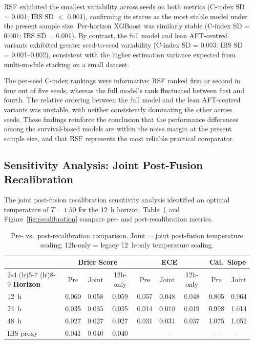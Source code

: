 \documentclass[fire,article,submit,pdftex]{../Definitions/mdpi}
\begin{document}
RSF exhibited the smallest variability across seeds on both metrics (C-index SD = 0.001; IBS SD $<$ 0.001), confirming its status as the most stable model under the present sample size.
Per-horizon XGBoost was similarly stable (C-index SD = 0.001; IBS SD = 0.001).
By contrast, the full model and lean AFT-centred variants exhibited greater seed-to-seed variability (C-index SD = 0.003; IBS SD = 0.001--0.002), consistent with the higher estimation variance expected from multi-module stacking on a small dataset.

The per-seed C-index rankings were informative: RSF ranked first or second in four out of five seeds, whereas the full model's rank fluctuated between first and fourth.
The relative ordering between the full model and the lean AFT-centred variants was unstable, with neither consistently dominating the other across seeds.
These findings reinforce the conclusion that the performance differences among the survival-based models are within the noise margin at the present sample size, and that RSF represents the most reliable practical comparator.

\subsection{Sensitivity Analysis: Joint Post-Fusion Recalibration}\label{sec:recal_results}

The joint post-fusion recalibration sensitivity analysis identified an optimal temperature of $T = 1.50$ for the 12~h horizon.
Table~\ref{tab:recalibration} and Figure~\ref{fig:recalibration} compare pre- and post-recalibration metrics.

\begin{table}[!ht]
\caption{Pre- vs.\ post-recalibration comparison. Joint = joint post-fusion temperature scaling; 12h-only = legacy 12~h-only temperature scaling.}\label{tab:recalibration}
\begin{tabular}{lcccccccc}
\toprule
 & \multicolumn{3}{c}{\textbf{Brier Score}} & \multicolumn{3}{c}{\textbf{ECE}} & \multicolumn{2}{c}{\textbf{Cal.\ Slope}} \\
\cmidrule(lr){2-4} \cmidrule(lr){5-7} \cmidrule(lr){8-9}
\textbf{Horizon} & Pre & Joint & 12h-only & Pre & Joint & 12h-only & Pre & Joint \\
\midrule
12~h & 0.060 & 0.058 & 0.059 & 0.057 & 0.048 & 0.048 & 0.805 & 0.964 \\
24~h & 0.035 & 0.035 & 0.035 & 0.014 & 0.010 & 0.019 & 0.998 & 1.014 \\
48~h & 0.027 & 0.027 & 0.027 & 0.031 & 0.031 & 0.037 & 1.075 & 1.052 \\
\midrule
IBS proxy & 0.041 & 0.040 & 0.040 & --- & --- & --- & --- & --- \\
\bottomrule
\end{tabular}
\end{table}
\end{document}
